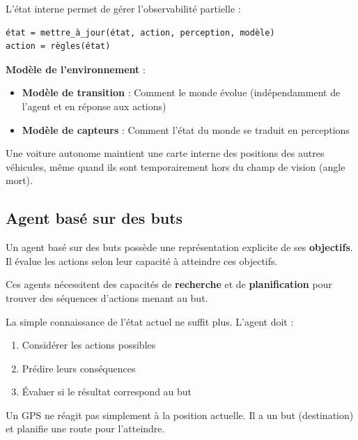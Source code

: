 \documentclass[11pt,a4paper]{article}
\begin{document}
L'état interne permet de gérer l'observabilité partielle :

\begin{lstlisting}
état = mettre_à_jour(état, action, perception, modèle)
action = règles(état)
\end{lstlisting}

\textbf{Modèle de l'environnement} :
\begin{itemize}
    \item \textbf{Modèle de transition} : Comment le monde évolue (indépendamment de l'agent et en réponse aux actions)
    \item \textbf{Modèle de capteurs} : Comment l'état du monde se traduit en perceptions
\end{itemize}

\begin{exemplebox}
Une voiture autonome maintient une carte interne des positions des autres véhicules, même quand ils sont temporairement hors du champ de vision (angle mort).
\end{exemplebox}

\subsection{Agent basé sur des buts}

\begin{definitionbox}
Un agent basé sur des buts possède une représentation explicite de ses \textbf{objectifs}. Il évalue les actions selon leur capacité à atteindre ces objectifs.
\end{definitionbox}

Ces agents nécessitent des capacités de \textbf{recherche} et de \textbf{planification} pour trouver des séquences d'actions menant au but.

La simple connaissance de l'état actuel ne suffit plus. L'agent doit :
\begin{enumerate}
    \item Considérer les actions possibles
    \item Prédire leurs conséquences
    \item Évaluer si le résultat correspond au but
\end{enumerate}

\begin{exemplebox}
Un GPS ne réagit pas simplement à la position actuelle. Il a un but (destination) et planifie une route pour l'atteindre.
\end{exemplebox}
\end{document}
